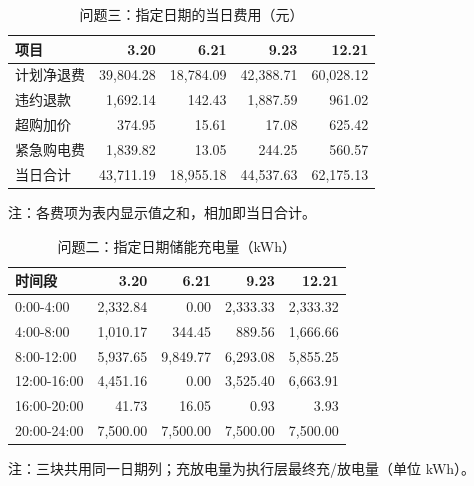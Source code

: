 \begin{table}[htbp]
\centering
\caption{问题三：指定日期的当日费用（元）}
\label{tab:q3-a2}
\small
\setlength{\tabcolsep}{4pt}
\begin{tabular}{lrrrr}
\toprule
项目 & 3.20 & 6.21 & 9.23 & 12.21 \\
\midrule
计划净退费 & 39,804.28 & 18,784.09 & 42,388.71 & 60,028.12 \\
违约退款 & 1,692.14 & 142.43 & 1,887.59 & 961.02 \\
超购加价 & 374.95 & 15.61 & 17.08 & 625.42 \\
紧急购电费 & 1,839.82 & 13.05 & 244.25 & 560.57 \\
当日合计 & 43,711.19 & 18,955.18 & 44,537.63 & 62,175.13 \\
\bottomrule
\end{tabular}
\vspace{2pt}
\begin{flushleft}\footnotesize 注：各费项为表内显示值之和，相加即当日合计。\end{flushleft}
\end{table}
\begin{table}[htbp]
\centering
\caption{问题二：指定日期储能充电量（kWh）}
\label{tab:q2-b1}
\small
\setlength{\tabcolsep}{4pt}
\begin{tabular}{lrrrr}
\toprule
时间段 & 3.20 & 6.21 & 9.23 & 12.21 \\
\midrule
0:00-4:00 & 2,332.84 & 0.00 & 2,333.33 & 2,333.32 \\
4:00-8:00 & 1,010.17 & 344.45 & 889.56 & 1,666.66 \\
8:00-12:00 & 5,937.65 & 9,849.77 & 6,293.08 & 5,855.25 \\
12:00-16:00 & 4,451.16 & 0.00 & 3,525.40 & 6,663.91 \\
16:00-20:00 & 41.73 & 16.05 & 0.93 & 3.93 \\
20:00-24:00 & 7,500.00 & 7,500.00 & 7,500.00 & 7,500.00 \\
\bottomrule
\end{tabular}
\vspace{2pt}
\begin{flushleft}\footnotesize 注：三块共用同一日期列；充放电量为执行层最终充/放电量（单位 kWh）。\end{flushleft}
\end{table}
